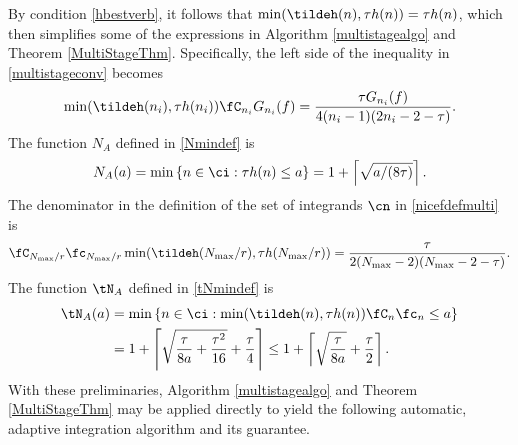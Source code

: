 By condition \eqref{hbestverb}, it follows that $\min(\tildeh(n),\tau h(n))=\tau h(n)$, which then simplifies some of the expressions in Algorithm \ref{multistagealgo} and Theorem \ref{MultiStageThm}.  Specifically, the left side of the inequality in \eqref{multistageconv} becomes
\[
\min(\tildeh(n_i),\tau h(n_i))\fC_{n_i} G_{n_i}(f) = \frac{\tau  G_{n_i}(f) } {4(n_i-1)(2n_i-2 -\tau)}.
\]
The function $N_A$ defined in \eqref{Nmindef} is
\[
N_{A}(a)= \min\left\{ n \in \ci : \tau h(n) \le a \right\} = 1+ \left \lceil \sqrt{a/(8\tau)}\right \rceil.
\]
The denominator in the definition of the set of integrands $\cn$ in \eqref{nicefdefmulti} is
\[
\fC_{N_{\max}/r} \fc_{N_{\max}/r} \min(\tildeh(N_{\max}/r),\tau h(N_{\max}/r)) =
\frac{\tau}{2 (N_{\max}-2)(N_{\max}-2 -\tau)}.
\]
The function $\tN_A$ defined in \eqref{tNmindef} is
\begin{align*} \label{tNmindef}
\tN_A(a) &= \min\left\{ n \in \ci : \min(\tildeh(n),\tau h(n))\fC_n\fc_n \le a \right\} \\
&= 1+ \left \lceil \sqrt{\frac{\tau}{8a} + \frac{\tau^2}{16}} +\frac{\tau}{4} \right \rceil \le 1+ \left \lceil\sqrt{\frac{\tau}{8a}} + \frac{\tau}{2} \right \rceil.
\end{align*}
With these preliminaries, Algorithm \ref{multistagealgo} and Theorem \ref{MultiStageThm} may be applied directly to  yield the following automatic, adaptive integration algorithm and its guarantee.

